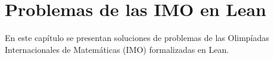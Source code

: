 \chapter{Problemas de las IMO en Lean}

En este capítulo se presentan soluciones de problemas de las Olimpíadas
Internacionales de Matemáticas (IMO) formalizadas en Lean.


